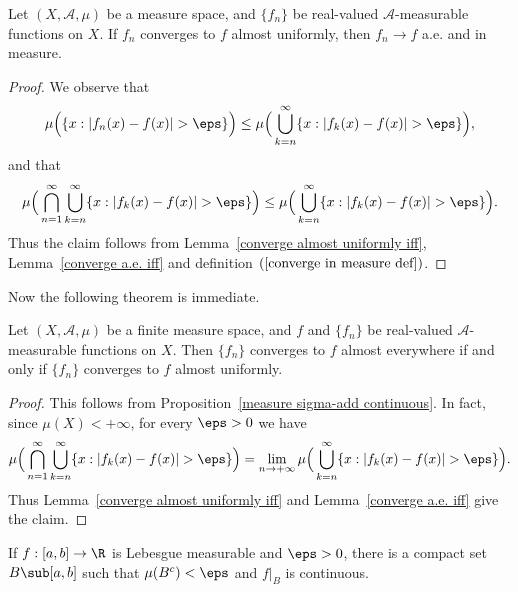 \begin{corollary}\label{converge a.u. imply a.e. and in measure}
Let $(X,\mathcal{A},\mu)$ be a measure space, and $\{f_n\}$ be real-valued $\mathcal{A}$-measurable functions on $X$. If $f_n$ converges to $f$ almost uniformly, then $f_n\to f$ a.e. and in measure.
\end{corollary}
\begin{proof}
We observe that
\begin{align*}
\mu\Big(\{x:|f_n(x)-f(x)|>\eps\}\Big)\leq\mu\Big(\bigcup_{k=n}^{\infty}\{x:|f_k(x)-f(x)|>\eps\}\Big),
\end{align*}
and that
\begin{align*}
\mu\Big(\bigcap_{n=1}^{\infty}\bigcup_{k=n}^{\infty}\{x:|f_k(x)-f(x)|>\eps\}\Big)\leq\mu\Big(\bigcup_{k=n}^{\infty}\{x:|f_k(x)-f(x)|>\eps\}\Big).
\end{align*}
Thus the claim follows from Lemma~\ref{converge almost uniformly iff}, Lemma~\ref{converge a.e. iff} and definition $(\ref{converge in measure def})$.
\end{proof}
Now the following theorem is immediate.
\begin{theorem}\label{Egoroff theorem}
Let $(X,\mathcal{A},\mu)$ be a finite measure space, and $f$ and $\{f_n\}$ be real-valued $\mathcal{A}$-measurable functions on $X$. Then $\{f_n\}$ converges to $f$ almost everywhere if and only if $\{f_n\}$ converges to $f$ almost uniformly.
\end{theorem}
\begin{proof}
This follows from Proposition~\ref{measure sigma-add continuous}. In fact, since $\mu(X)<+\infty$, for every $\eps>0$ we have
\[\mu\Big(\bigcap_{n=1}^{\infty}\bigcup_{k=n}^{\infty}\{x:|f_k(x)-f(x)|>\eps\}\Big)=\lim_{n\to+\infty}\mu\Big(\bigcup_{k=n}^{\infty}\{x:|f_k(x)-f(x)|>\eps\}\Big).\]
Thus Lemma~\ref{converge almost uniformly iff} and Lemma~\ref{converge a.e. iff} give the claim.
\end{proof}
\begin{theorem}
If $f:[a,b]\to\R$ is Lebesgue measurable and $\eps>0$, there is a compact set $B\sub[a,b]$ such that $\mu(B^c)<\eps$ and $f|_B$ is continuous.
\end{theorem}
